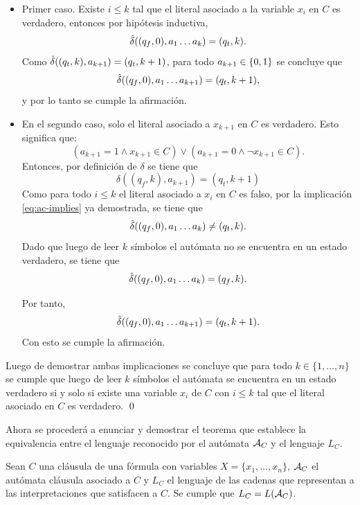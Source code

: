 \begin{itemize}
    \item Primer caso. Existe $i \leq k$ tal que el literal asociado a la variable $x_i$ en $C$ es verdadero, entonces por hipótesis inductiva,
          $$
              \hat{\delta}((q_f, 0), a_1 \ldots a_k) = (q_t, k).
          $$
          Como $\hat{\delta} ((q_t, k), a_{k+1}) = (q_t, k+1)$, para todo $a_{k+1} \in \{0, 1\}$ se concluye que
          $$
              \hat{\delta}((q_f, 0), a_1 \ldots a_{k+1}) = (q_t, k+1),
          $$
          y por lo tanto se cumple la afirmación.
    \item En el segundo caso, solo el literal asociado a $x_{k+1}$ en $C$ es verdadero. Esto significa que:
          $$
              (a_{k+1}=1 \land x_{k+1}\in C)
              \lor
              (a_{k+1}=0 \land \neg x_{k+1}\in C).
          $$
          Entonces, por definición de \(\delta\) se tiene que
          $$
              \delta((q_f,k),a_{k+1})=(q_t,k+1)
          $$
          Como para todo $i \leq k$ el literal asociado a $x_i$ en $C$ es falso, por la implicación \ref{eq:ac-implies} ya demostrada, se tiene que
          $$
              \hat{\delta}((q_f, 0), a_1 \ldots a_k) \neq (q_t, k).
          $$
          Dado que luego de leer $k$ símbolos el autómata no se encuentra en un estado verdadero, se tiene que
          $$
              \hat{\delta}((q_f, 0), a_1 \ldots a_k) = (q_f, k).
          $$


          Por tanto,
          $$
              \hat{\delta}((q_f, 0),a_1\ldots a_{k+1})=(q_t,k+1).
          $$
          Con esto se cumple la afirmación.
\end{itemize}

Luego de demostrar ambas implicaciones se concluye que para todo $k \in \{1, \ldots, n\}$ se cumple que luego de leer $k$ símbolos el autómata se encuentra en un estado verdadero si y solo si existe una variable $x_i$ de $C$ con $i \leq k$ tal que el literal asociado en $C$ es verdadero. \qed


Ahora se procederá a enunciar y demostrar el teorema que establece la equivalencia entre el lenguaje reconocido por el autómata $\mathcal{A}_{C}$ y el lenguaje $L_C$.

\begin{theorem}
    \label{thm:cautomata}
    Sean $C$ una cláusula de una fórmula con variables $X = \{x_1, \ldots, x_n\}$, $\mathcal{A}_{C}$ el autómata cláusula asociado a $C$ y $L_C$ el lenguaje de las cadenas que representan a las interpretaciones que satisfacen a $C$. Se cumple que $L_C = L(\mathcal{A}_{C})$.
\end{theorem}

